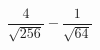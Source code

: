 \begin{ex}[type=calculate]
	\begin{condition}
		\( \dfrac{4}{\sqrt{256}}-\dfrac{1}{\sqrt{64}} \)
	\end{condition}
\end{ex}
